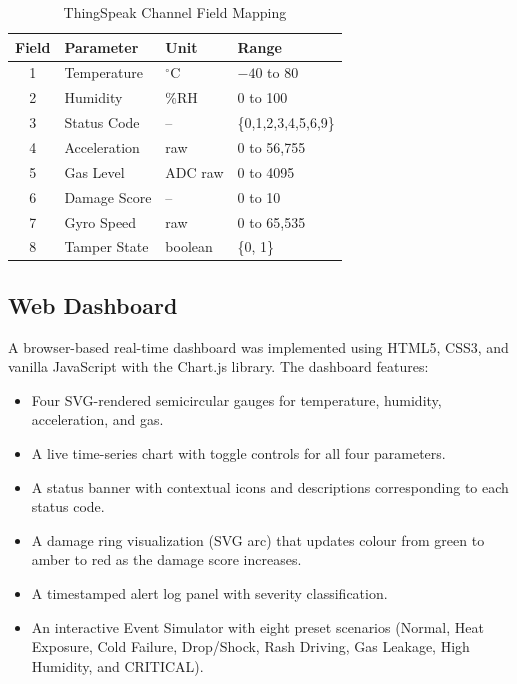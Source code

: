 \documentclass[12pt, a4paper]{article}
\begin{document}
\begin{table}[H]
\centering
\caption{ThingSpeak Channel Field Mapping}
\label{tab:fields}
\renewcommand{\arraystretch}{1.3}
\begin{tabular}{clll}
\toprule
\textbf{Field} & \textbf{Parameter} & \textbf{Unit} & \textbf{Range} \\
\midrule
1 & Temperature   & $^\circ$C    & $-40$ to $80$ \\
2 & Humidity      & \%RH         & 0 to 100      \\
3 & Status Code   & --           & \{0,1,2,3,4,5,6,9\} \\
4 & Acceleration  & raw          & 0 to 56,755   \\
5 & Gas Level     & ADC raw      & 0 to 4095     \\
6 & Damage Score  & --           & 0 to 10       \\
7 & Gyro Speed    & raw          & 0 to 65,535   \\
8 & Tamper State  & boolean      & \{0, 1\}      \\
\bottomrule
\end{tabular}
\end{table}

\subsection{Web Dashboard}

A browser-based real-time dashboard was implemented using HTML5, CSS3, and vanilla JavaScript with the Chart.js library. The dashboard features:
\begin{itemize}
  \item Four SVG-rendered semicircular gauges for temperature, humidity, acceleration, and gas.
  \item A live time-series chart with toggle controls for all four parameters.
  \item A status banner with contextual icons and descriptions corresponding to each status code.
  \item A damage ring visualization (SVG arc) that updates colour from green to amber to red as the damage score increases.
  \item A timestamped alert log panel with severity classification.
  \item An interactive Event Simulator with eight preset scenarios (Normal, Heat Exposure, Cold Failure, Drop/Shock, Rash Driving, Gas Leakage, High Humidity, and CRITICAL).
\end{itemize}
\end{document}
